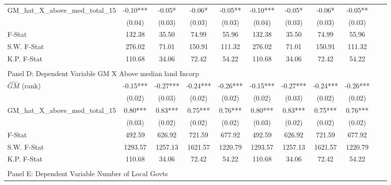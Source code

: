 \begin{table}[htbp]
\begin{threeparttable}
\begin{tabular}{l*{10}{c}}
\addlinespace
GM\_hat\_X\_above\_med\_total\_15&      -0.10***&      -0.05*  &      -0.06*  &      -0.05** &      -0.10***&      -0.05*  &      -0.06*  &      -0.05** \\
                &     (0.04)   &     (0.03)   &     (0.03)   &     (0.03)   &     (0.04)   &     (0.03)   &     (0.03)   &     (0.03)   \\
\midrule
F-Stat          &     132.38   &      35.50   &      74.99   &      55.96   &     132.38   &      35.50   &      74.99   &      55.96   \\
S.W. F-Stat     &     276.02   &      71.01   &     150.91   &     111.32   &     276.02   &      71.01   &     150.91   &     111.32   \\
K.P. F-Stat     &     110.68   &      34.06   &      72.42   &      54.22   &     110.68   &      34.06   &      72.42   &      54.22   \\
\cmidrule[\heavyrulewidth](lr){1-9} \\ \cmidrule[\heavyrulewidth](lr){1-9}
\multicolumn{8}{l}{Panel D: Dependent Variable GM X Above median land Incorp}\\
\cmidrule(lr){1-9}
$\hat{GM}$ (rank)&      -0.15***&      -0.27***&      -0.24***&      -0.26***&      -0.15***&      -0.27***&      -0.24***&      -0.26***\\
                &     (0.02)   &     (0.03)   &     (0.02)   &     (0.02)   &     (0.02)   &     (0.03)   &     (0.02)   &     (0.02)   \\
\addlinespace
GM\_hat\_X\_above\_med\_total\_15&       0.80***&       0.83***&       0.75***&       0.76***&       0.80***&       0.83***&       0.75***&       0.76***\\
                &     (0.03)   &     (0.02)   &     (0.02)   &     (0.02)   &     (0.03)   &     (0.02)   &     (0.02)   &     (0.02)   \\
\midrule
F-Stat          &     492.59   &     626.92   &     721.59   &     677.92   &     492.59   &     626.92   &     721.59   &     677.92   \\
S.W. F-Stat     &    1293.57   &    1257.13   &    1621.57   &    1220.79   &    1293.57   &    1257.13   &    1621.57   &    1220.79   \\
K.P. F-Stat     &     110.68   &      34.06   &      72.42   &      54.22   &     110.68   &      34.06   &      72.42   &      54.22   \\
\cmidrule[\heavyrulewidth](lr){1-9} \\ \cmidrule[\heavyrulewidth](lr){1-9}
\multicolumn{8}{l}{Panel E: Dependent Variable Number of Local Govts}\\

\end{tabular}
\end{threeparttable}
\end{table}

